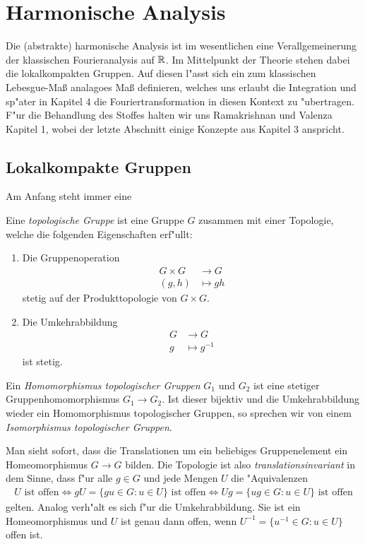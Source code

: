 \section{Harmonische Analysis}\label{sec:topogroup}
	Die (abstrakte) harmonische Analysis ist im wesentlichen eine Verallgemeinerung der klassischen Fourieranalysis auf $\mathbb{R}$.
	Im Mittelpunkt der Theorie stehen dabei die lokalkompakten Gruppen.
	Auf diesen l"asst sich ein zum klassischen Lebesgue-Maß analagoes Maß definieren, welches uns erlaubt die Integration und sp"ater in Kapitel 4 die Fouriertransformation in diesen Kontext zu "ubertragen.
	F"ur die Behandlung des Stoffes halten wir uns Ramakrishnan und Valenza \cite{rama} Kapitel 1, wobei der letzte Abschnitt einige Konzepte aus Kapitel 3 anspricht.
\subsection{Lokalkompakte Gruppen}
Am Anfang steht immer eine
\begin{defi}
	Eine \emph{topologische Gruppe} ist eine Gruppe $G$ zusammen mit einer Topologie, welche die folgenden Eigenschaften erf"ullt:
		\begin{enumerate}[label=(\roman*)] %
			\item Die Gruppenoperation
				\begin{align*}
					G \times G &\longrightarrow G\\
					(g,h) &\longmapsto gh
				\end{align*}
			stetig auf der Produkttopologie von $G \times G$.
			\item Die Umkehrabbildung
				\begin{align*}
					G &\longrightarrow G\\
					g &\longmapsto g^{-1}
				\end{align*}
				ist stetig.
		\end{enumerate}
	Ein \emph{Homomorphismus topologischer Gruppen} $G_1$ und $G_2$ ist eine stetiger Gruppenhomomorphismus $G_1 \to G_2$.
	Ist dieser bijektiv und die Umkehrabbildung wieder ein Homomorphismus topologischer Gruppen, so sprechen wir von einem \emph{Isomorphismus topologischer Gruppen}.
\end{defi}
	
	Man sieht sofort, dass die Translationen um ein beliebiges Gruppenelement ein Homeomorphismus $G \to G$ bilden.
	Die Topologie ist also \emph{translationsinvariant} in dem Sinne, dass f"ur alle $g \in G$ und jede Mengen $U$ die "Aquivalenzen
	\begin{align*}
		U \text{ ist offen} \Leftrightarrow gU = \{gu \in G: u\in U\} \text{ ist offen} \Leftrightarrow Ug = \{ug \in G: u\in U\} \text{ ist offen}
	\end{align*}
	gelten.
	Analog verh"alt es sich f"ur die Umkehrabbildung. Sie ist ein Homeomorphismus und $U$ ist genau dann offen, wenn $U^{-1}=\{u^{-1}\in G: u \in U\}$ offen ist.
	
